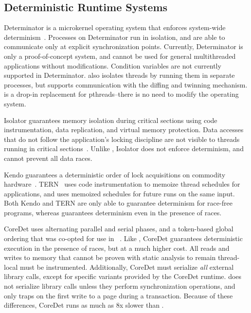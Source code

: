 \label{sec:related-work}

\subsection{Deterministic Runtime Systems}

Determinator is a microkernel operating system that enforces system-wide determinism~\cite{efficient-system-enforced}.  Processes on Determinator run in isolation, and are able to communicate only at explicit synchronization points.  Currently, Determinator is only a proof-of-concept system, and cannot be used for general multithreaded applications without modifications.  Condition variables are not currently supported in Determinator.  \dthreads{} also isolates threads by running them in separate processes, but supports communication with the diffing and twinning mechanism.  \dthreads{} is a drop-in replacement for pthreads--there is no need to modify the operating system.


Isolator guarantees memory isolation during critical sections using code instrumentation, data replication, and virtual memory protection.  Data accesses that do not follow the application's locking discipline are not visible to threads running in critical sections~\cite{1508266}.  Unlike \dthreads{}, Isolator does not enforce determinism, and cannot prevent all data races.

Kendo guarantees a deterministic order of lock acquisitions on commodity hardware~\cite{1508256}. TERN~\cite{stable-deterministic} uses code instrumentation to memoize thread schedules for applications, and uses memoized schedules for future runs on the same input.  Both Kendo and TERN are only able to guarantee determinism for race-free programs, whereas \dthreads{} guarantees determinism even in the presence of races.

CoreDet uses alternating parallel and serial phases, and a token-based global ordering that was co-opted for use in \dthreads{}~\cite{Bergan:2010:CCR:1736020.1736029}.  Like \dthreads{}, CoreDet guarantees deterministic execution in the presence of races, but at a much higher cost.  All reads and writes to memory that cannot be proven with static analysis to remain thread-local must be instrumented.  Additionally, CoreDet must serialize \emph{all} external library calls, except for specific variants provided by the CoreDet runtime.  \dthreads{} does not serialize library calls unless they perform synchronization operations, and only traps on the first write to a page during a transaction.  Because of these differences, CoreDet runs as much as 8x slower than \dthreads{}.

